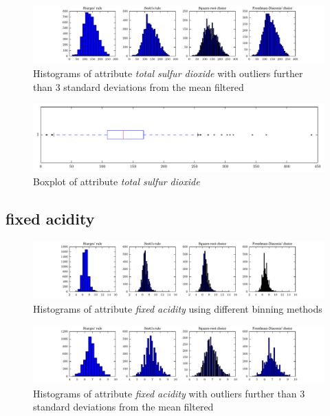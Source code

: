 \documentclass{report}
\begin{document}
\begin{figure}[H]
\includegraphics[width=\textwidth]{histograms/total_sulfur_dioxide_filtered.pdf}
\caption{Histograms of attribute \emph{total sulfur dioxide} with outliers further than 3 standard deviations from the mean filtered}
\end{figure}

\begin{figure}[H]
\includegraphics[width=\textwidth]{boxplots/total_sulfur_dioxide.pdf}
\caption{Boxplot of attribute \emph{total sulfur dioxide}}\end{figure}

\newpage\subsection{fixed acidity}
\begin{figure}[H]
\includegraphics[width=\textwidth]{histograms/fixed_acidity.pdf}
\caption{Histograms of attribute \emph{fixed acidity} using different binning methods}\end{figure}

\begin{figure}[H]
\includegraphics[width=\textwidth]{histograms/fixed_acidity_filtered.pdf}
\caption{Histograms of attribute \emph{fixed acidity} with outliers further than 3 standard deviations from the mean filtered}
\end{figure}
\end{document}
